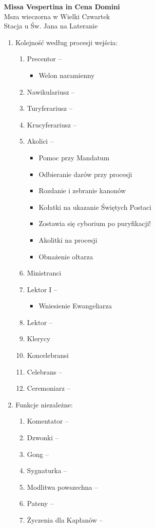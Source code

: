 \documentclass[10pt,oneside,final,notitlepage,a4paper,wide]{mwart}
\begin{document}
%
\begin{center}
	\LARGE{\textbf{Missa Vespertina in Cena Domini}}\\ \smallskip
	\small{Msza wieczorna w Wielki Czwartek\\ \smallskip Stacja u Św. Jana na Lateranie}
\end{center} \vspace{1cm}

\begin{enumerate}
	\item Kolejność według procesji wejścia:
	\begin{enumerate}
		\item Precentor --
			\begin{itemize}
				\item Welon naramienny
			\end{itemize}
		\item Nawikulariusz -- 
		\item Turyferariusz --
		\item Krucyferariusz --
		\item Akolici --
			\begin{itemize}
				\item Pomoc przy Mandatum
				\item Odbieranie darów przy procesji
				\item Rozdanie i zebranie kanonów
				\item Kołatki na ukazanie Świętych Postaci
				\item Zostawia się cyborium po puryfikacji!
				\item Akolitki na procesji
				\item Obnażenie ołtarza
			\end{itemize}
		\item Ministranci
		\item Lektor I -- 
			\begin{itemize}
				\item Wniesienie Ewangeliarza
			\end{itemize}
		\item Lektor -- 
		\item Klerycy
		\item Koncelebransi
		\item Celebrans -- 
		\item Ceremoniarz -- 
\smallskip
	\end{enumerate}
	\item Funkcje niezależne:
	\begin{enumerate}
		\item Komentator -- 
		\item Dzwonki -- 
		\item Gong -- 
		\item Sygnaturka -- 
		\item Modlitwa powszechna -- 
		\item Pateny --
		\item Życzenia dla Kapłanów --
	\end{enumerate}
\end{enumerate}
\end{document}
